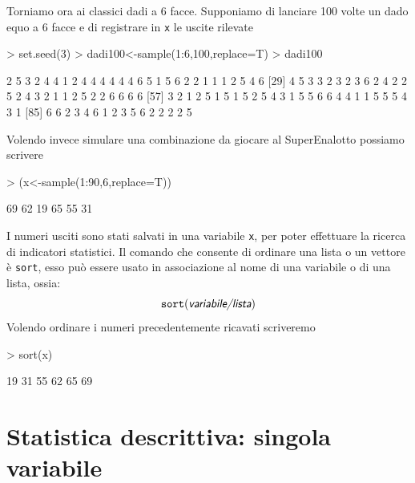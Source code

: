 \documentclass[onecolumn,12pt]{book}
\newcommand{\varia}[1]{\textsl{\textsf{#1}}}
\begin{document}
Torniamo ora ai classici dadi a 6 facce.
Supponiamo di lanciare 100 volte un dado equo a 6 facce e di registrare in \texttt{x}
le uscite rilevate
\begin{Schunk}
\begin{Sinput}
> set.seed(3)
> dadi100<-sample(1:6,100,replace=T)
> dadi100
\end{Sinput}
\begin{Soutput}
  [1] 2 5 3 2 4 4 1 2 4 4 4 4 4 4 6 5 1 5 6 2 2 1 1 1 2 5 4 6
 [29] 4 5 3 3 2 3 2 3 6 2 4 2 2 5 2 4 3 2 1 1 2 5 2 2 6 6 6 6
 [57] 3 2 1 2 5 1 5 1 5 2 5 4 3 1 5 5 6 6 4 4 1 1 5 5 5 4 3 1
 [85] 6 6 2 3 4 6 1 2 3 5 6 2 2 2 2 5
\end{Soutput}
\end{Schunk}
Volendo invece simulare una combinazione da giocare al SuperEnalotto possiamo scrivere
\begin{Schunk}
\begin{Sinput}
> (x<-sample(1:90,6,replace=T))
\end{Sinput}
\begin{Soutput}
[1] 69 62 19 65 55 31
\end{Soutput}
\end{Schunk}
I numeri usciti sono stati salvati  in una variabile \texttt{x}, per poter effettuare la ricerca di indicatori statistici.
Il comando che consente di ordinare una lista o un vettore \`e \texttt{sort}, esso pu\`o essere usato in associazione al nome di una variabile o di una lista, ossia:
\begin{equation}\texttt{sort}(\varia{variabile/lista})\end{equation}
Volendo ordinare i numeri precedentemente ricavati scriveremo
\begin{Schunk}
\begin{Sinput}
> sort(x)
\end{Sinput}
\begin{Soutput}
[1] 19 31 55 62 65 69
\end{Soutput}
\end{Schunk}



\section{Statistica descrittiva: singola variabile}
\end{document}
